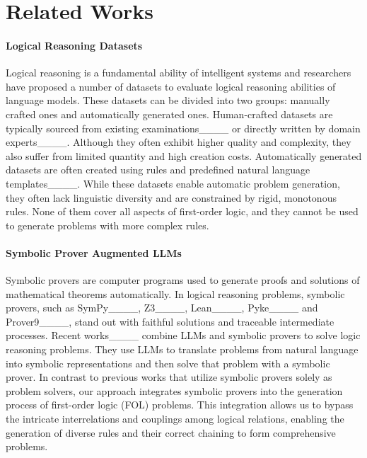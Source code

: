 \section{Related Works}
\label{sec:rela_work}

\paragraph{Logical Reasoning Datasets}
Logical reasoning is a fundamental ability of intelligent systems and researchers have proposed a number of datasets to evaluate logical reasoning abilities of language models. 
These datasets can be divided into two groups: manually crafted ones and automatically generated ones. 
Human-crafted datasets are typically sourced from existing examinations____ or directly written by domain experts____. 
Although they often exhibit higher quality and complexity, they also suffer from limited quantity and high creation costs.
Automatically generated datasets are often created using rules and predefined natural language templates____. 
While these datasets enable automatic problem generation, they often lack linguistic diversity and are constrained by rigid, monotonous rules. 
None of them cover all aspects of first-order logic, and they cannot be used to generate problems with more complex rules.


\paragraph{Symbolic Prover Augmented LLMs}
Symbolic provers are computer programs used to generate proofs and solutions of mathematical theorems automatically. 
In logical reasoning problems, symbolic provers, such as SymPy____, Z3____, Lean____, Pyke____ and Prover9____, stand out with faithful solutions and traceable intermediate processes. 
Recent works____ combine LLMs and symbolic provers to solve logic reasoning problems. 
They use LLMs to translate problems from natural language into symbolic representations and then solve that problem with a symbolic prover. 
In contrast to previous works that utilize symbolic provers solely as problem solvers, our approach integrates symbolic provers into the generation process of first-order logic (FOL) problems. 
This integration allows us to bypass the intricate interrelations and couplings among logical relations, enabling the generation of diverse rules and their correct chaining to form comprehensive problems.